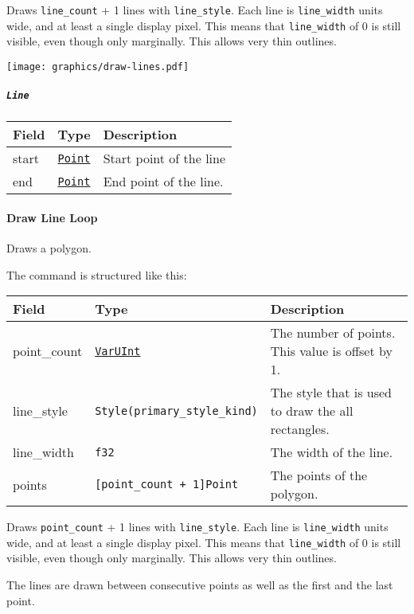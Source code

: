 \documentclass[]{article}
\begin{document}
Draws \texttt{line\_count} + 1 lines with \texttt{line\_style}. Each line is \texttt{line\_width} units wide, and at least a single display pixel. This means that \texttt{line\_width} of 0 is still visible, even though only marginally. This allows very thin outlines.


\texttt{[image: graphics/draw-lines.pdf]}

\hypertarget{line}{%
\subparagraph{\texorpdfstring{\texttt{Line}}{Line}}\label{line}}

\begin{longtable}[]{@{}p{1in}p{2in}p{3in}@{}}
\toprule
Field & Type & Description \\
\midrule
\endhead
start & \protect\hyperlink{point}{\texttt{Point}} & Start point of the line \\
end & \protect\hyperlink{point}{\texttt{Point}} & End point of the line. \\
\bottomrule
\end{longtable}

\hypertarget{draw-line-loop}{%
\paragraph{Draw Line Loop}\label{draw-line-loop}}

Draws a polygon.

The command is structured like this:

\begin{longtable}[]{@{}p{1in}p{2in}p{3in}@{}}
\toprule
Field & Type & Description \\
\midrule
\endhead
point\_count & \protect\hyperlink{varuint}{\texttt{VarUInt}} & The
number of points. This value is offset by 1. \\
line\_style & \texttt{Style(primary\_style\_kind)} & The style that is
used to draw the all rectangles. \\
line\_width & \texttt{f32} & The width of the line. \\
points & \texttt{{[}point\_count\ +\ 1{]}Point} & The points of the
polygon. \\
\bottomrule
\end{longtable}

Draws \texttt{point\_count} + 1 lines with \texttt{line\_style}. Each
line is \texttt{line\_width} units wide, and at least a single display
pixel. This means that \texttt{line\_width} of 0 is still visible, even
though only marginally. This allows very thin outlines.

The lines are drawn between consecutive points as well as the first and
the last point.
\end{document}
